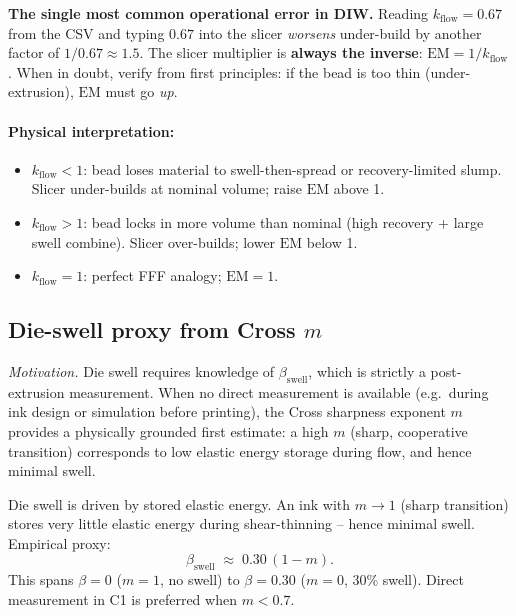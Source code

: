\documentclass[11pt,a4paper]{article}
\begin{document}
\begin{warningbox}
\textbf{The single most common operational error in DIW.}
Reading $k_\mathrm{flow}=0.67$ from the CSV and typing $0.67$ into
the slicer \emph{worsens} under-build by another factor of $1/0.67
\approx 1.5$. The slicer multiplier is \textbf{always the inverse}:
$\mathrm{EM}=1/k_\mathrm{flow}$. When in doubt, verify from first
principles: if the bead is too thin (under-extrusion), $\mathrm{EM}$
must go \emph{up}.
\end{warningbox}

\paragraph{Physical interpretation:}
\begin{itemize}[leftmargin=1.4em,itemsep=2pt]
\item $k_\mathrm{flow}<1$: bead loses material to swell-then-spread or
  recovery-limited slump. Slicer under-builds at nominal volume; raise
  $\mathrm{EM}$ above 1.
\item $k_\mathrm{flow}>1$: bead locks in more volume than nominal
  (high recovery + large swell combine). Slicer over-builds; lower
  $\mathrm{EM}$ below 1.
\item $k_\mathrm{flow}=1$: perfect FFF analogy; $\mathrm{EM}=1$.
\end{itemize}

\subsection{Die-swell proxy from Cross $m$}

\emph{Motivation.}
Die swell requires knowledge of $\beta_\mathrm{swell}$, which
is strictly a post-extrusion measurement. When no direct measurement
is available (e.g.\ during ink design or simulation before printing),
the Cross sharpness exponent $m$ provides a physically grounded
first estimate: a high $m$ (sharp, cooperative transition) corresponds
to low elastic energy storage during flow, and hence minimal swell.

Die swell is driven by stored elastic energy. An ink with $m\to 1$
(sharp transition) stores very little elastic energy during
shear-thinning -- hence minimal swell. Empirical proxy:
\begin{equation}
\beta_\mathrm{swell} \;\approx\; 0.30\,(1-m).
\label{eq:beta_proxy}
\end{equation}
This spans $\beta=0$ ($m=1$, no swell) to $\beta=0.30$ ($m=0$, 30\%
swell). Direct measurement in C1 is preferred when $m<0.7$.
\end{document}
